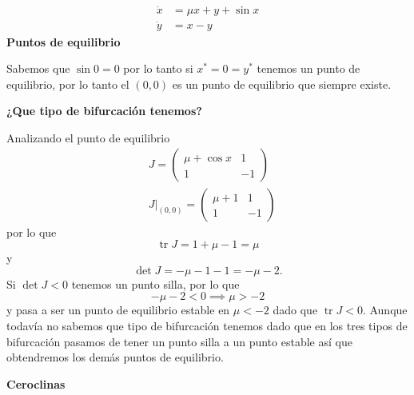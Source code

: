 \begin{ejemplo}
	\begin{align*}
	 \dot{x} &= \mu x + y + \sin x \\
	 \dot{y} &= x-y 
	\end{align*}
	\textbf{Puntos de equilibrio}
	
Sabemos que $\sin 0 = 0$ por lo tanto si $x^*=0=y^*$ tenemos un punto de equilibrio, por lo tanto el $(0,0)$ es un punto de equilibrio que siempre existe.

 \textbf{¿Que tipo de bifurcación tenemos?}

 Analizando el punto de equilibrio
 \begin{align*}
	 &J = \begin{pmatrix} \mu + \cos x & 1 \\ 1 & -1 \end{pmatrix} \\
	 &\left. J \right|_{(0,0)} = \begin{pmatrix} \mu + 1 & 1 \\ 1 & -1 \end{pmatrix}   
 \end{align*}
 por lo que $$\operatorname{tr}J = 1 + \mu - 1 = \mu$$ y $$\operatorname{det} J = -\mu - 1 -1 = -\mu-2.$$
 Si $ \operatorname{det} J < 0$ tenemos un punto silla, por lo que
 \begin{equation*}
	 -\mu-2 < 0 \implies \mu>-2
 \end{equation*}
 y pasa a ser un punto de equilibrio estable en $ \mu < -2$ dado que $\operatorname{tr}J<0$. Aunque todavía no sabemos que tipo de bifurcación tenemos dado que en los tres tipos de bifurcación pasamos de tener un punto silla a un punto estable así que obtendremos los demás puntos de equilibrio.
 \vspace{2mm}
 

 \textbf{Ceroclinas}


\end{ejemplo}
